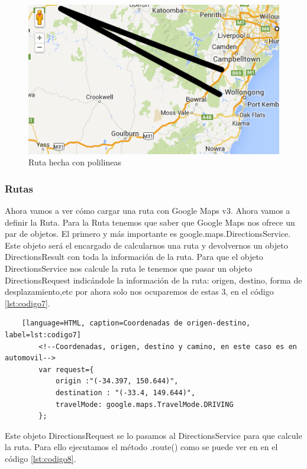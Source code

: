     \begin{figure}[hbtp]
        \centering
            \includegraphics{Imagenes/Cap2_3_7.png}
            \caption{Ruta hecha con polilineas}   
            \label{fig:Cap2_3_7}
    \end{figure}   
    
    \subsubsection{Rutas}
    Ahora vamos a ver cómo cargar una ruta con Google Maps v3.
Ahora vamos a definir la Ruta. Para la Ruta tenemos que saber que Google Maps nos ofrece un par de objetos. El primero y más importante es google.maps.DirectionsService. Este objeto será el encargado de calcularnos una ruta y devolvernos un objeto DirectionsResult con toda la información de la ruta.
Para que el objeto DirectionsService nos calcule la ruta le tenemos que pasar un objeto DirectionsRequest indicándole la información de la ruta: origen, destino, forma de desplazamiento,etc por ahora solo nos ocuparemos de estas 3, en el código \ref{lst:codigo7}.\\

    \begin{lstlisting}
    [language=HTML, caption=Coordenadas de origen-destino, label=lst:codigo7]
        <!--Coordenadas, origen, destino y camino, en este caso es en automovil-->
    	var request={
    		origin :"(-34.397, 150.644)",
    		destination : "(-33.4, 149.644)",
    		travelMode: google.maps.TravelMode.DRIVING
    	};
    \end{lstlisting}
    
\hspace*{1cm}Este objeto DirectionsRequest se lo pasamos al DirectionsService para que calcule la ruta. Para ello ejecutamos el método .route() como se puede ver en en el código \ref{lst:codigo8}.\\

